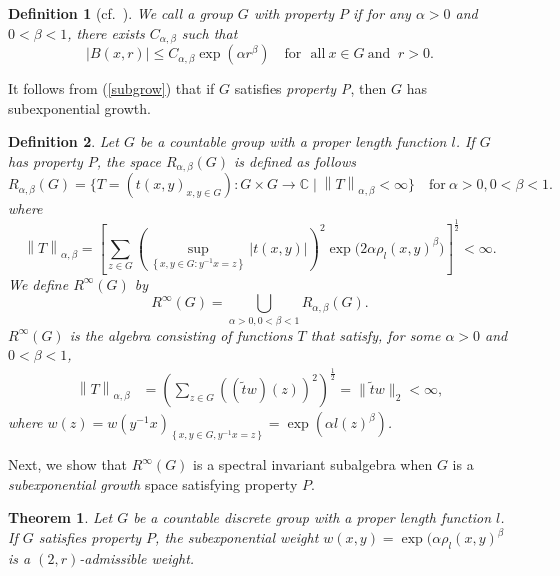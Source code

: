 \documentclass[preprint,11pt]{elsarticle}
\newtheorem{theorem}{Theorem}[section]
\newtheorem{definition}{Definition}[section]
\numberwithin{equation}{section}
\begin{document}
	\begin{definition}[cf.~\cite{CW2003,2Y1995}] 
		We call a group $G$ with property $P$ if for any $\alpha>0$ and $0<\beta<1$, there exists $C_{\alpha ,\beta }$ such that
		\[ \left | B(x,r) \right | \le C_{\alpha ,\beta }\exp(\alpha r^{\beta })\quad\text{for~ all}~  x\in G~\text{and
		}~r>0.\]
	\end{definition}
	It follows from (\ref{subgrow}) that if $G$ satisfies {\it property P}, then $G$ has subexponential growth.
	\begin{definition}
		Let $G$ be a countable group with a proper length function $l$. If $G$ has property $P$,  the space $R_{\alpha ,\beta }(G)$ is defined as follows  
		\[R_{\alpha ,\beta }(G)= \{ T=(t(x,y)_{x,y\in G}):G\times G\longrightarrow \mathbb{C}\mid  \left \| T \right \|_{\alpha,\beta}<\infty   \}\quad\text{for}~\alpha>0,0<\beta<1.\]
		where
		\[\left \| T \right \| _{\alpha ,\beta }= [ {\sum_{z\in G} (\sup_{\left \{ x,y\in G:y^{-1}x=z \right \} }\left | t\left (x,y\right) \right | )^2   \exp(2\alpha  \rho_{l} (x,y)^{\beta }}) ]^\frac{1}{2} <\infty.\]
		We define $R^{\infty }(G)$ by
		\[R^{\infty }(G)=\bigcup _{\alpha>0,0<\beta<1 }R_{\alpha ,\beta }(G).\]
		$R^{\infty }(G)$ 
		is the algebra consisting of functions $T$ that satisfy, for some $\alpha>0$ and $0<\beta<1$,
		\begin{align*}
			\left \| T \right \| _{\alpha ,\beta }&=
			(\sum_{z\in G}  \left((\tilde{t}w)(z)\right)^{2} ) ^\frac{1}{2} = \|  \tilde {t}w  \|_2<\infty,  
		\end{align*}
		where $w(z)=w(y^{-1}x)_{\left \{x,y\in G, y^{-1}x=z \right \} }=\exp(\alpha l(z)^{\beta })$.	
	\end{definition}
	Next, we show that $R^{\infty }(G)$ is a spectral invariant subalgebra when $G$ is a {\it subexponential growth} space satisfying property $P$.
	
	
	\begin{theorem}\label{thm4.2}
		Let $G$ be a countable discrete group with a proper length function $l$. If $G$ satisfies property $P$,  the subexponential weight $w(x,y)=\exp(\alpha \rho_{l }(x,y)^{\beta}$ is a $(2,r)$-admissible weight.
	\end{theorem}
	
\end{document}
